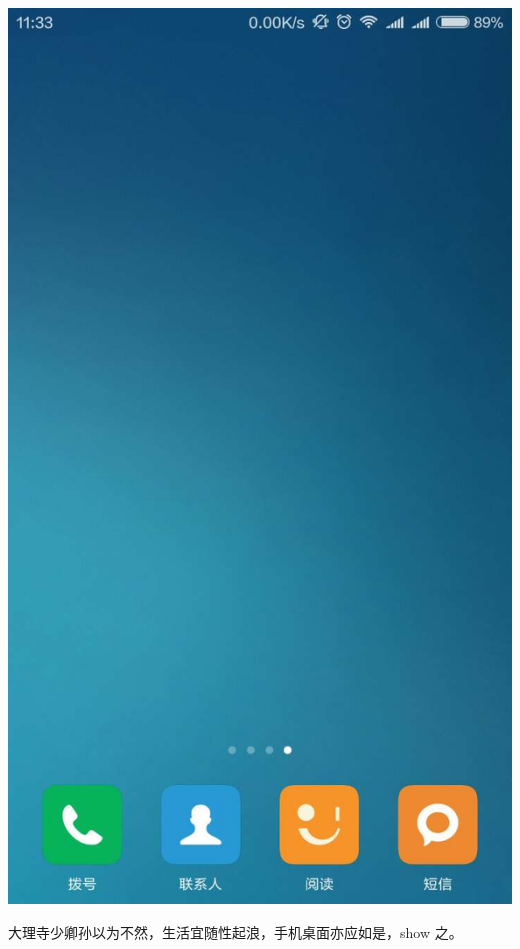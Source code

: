 \documentclass[12pt, a4paper]{book}
\begin{document}
\begin{CJK}{UTF8}{gbsn}
    \begin{center}
    \includegraphics[height=0.3\textheight]{./figure/desktop-3.jpg}
    \end{center}

    大理寺少卿孙以为不然，生活宜随性起浪，手机桌面亦应如是，show 之。


\end{CJK}
\end{document}
